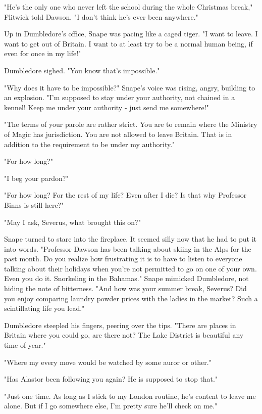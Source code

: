 \documentclass[a4paper,11pt]{article}
\begin{document}
"He's the only one who never left the school during the whole Christmas break," Flitwick told Dawson. "I don't think he's ever been anywhere."

Up in Dumbledore's office, Snape was pacing like a caged tiger. "I want to leave. I want to get out of Britain. I want to at least try to be a normal human being, if even for once in my life!"

Dumbledore sighed. "You know that's impossible."

"Why does it have to be impossible?" Snape's voice was rising, angry, building to an explosion. "I'm supposed to stay under your authority, not chained in a kennel! Keep me under your authority - just send me somewhere!"

"The terms of your parole are rather strict. You are to remain where the Ministry of Magic has jurisdiction. You are not allowed to leave Britain. That is in addition to the requirement to be under my authority."

"For how long?"

"I beg your pardon?"

"For how long? For the rest of my life? Even after I die? Is that why Professor Binns is still here?"

"May I ask, Severus, what brought this on?"

Snape turned to stare into the fireplace. It seemed silly now that he had to put it into words. "Professor Dawson has been talking about skiing in the Alps for the past month. Do you realize how frustrating it is to have to listen to everyone talking about their holidays when you're not permitted to go on one of your own. Even you do it. Snorkeling in the Bahamas." Snape mimicked Dumbledore, not hiding the note of bitterness. "And how was your summer break, Severus? Did you enjoy comparing laundry powder prices with the ladies in the market? Such a scintillating life you lead."

Dumbledore steepled his fingers, peering over the tips. "There are places in Britain where you could go, are there not? The Lake District is beautiful any time of year."

"Where my every move would be watched by some auror or other."

"Has Alastor been following you again? He is supposed to stop that."

"Just one time. As long as I stick to my London routine, he's content to leave me alone. But if I go somewhere else, I'm pretty sure he'll check on me."
\end{document}
